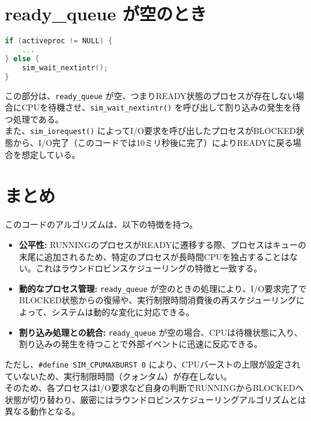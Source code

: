 \documentclass{article}
\begin{document}
\section*{ready\_queue が空のとき}
\begin{lstlisting}[language=C]
if (activeproc != NULL) {
    ... 
} else {
    sim_wait_nextintr();
}
\end{lstlisting}
この部分は、\texttt{ready\_queue} が空、つまりREADY状態のプロセスが存在しない場合にCPUを待機させ、\texttt{sim\_wait\_nextintr()} を呼び出して割り込みの発生を待つ処理である。\\
また、\texttt{sim\_iorequest()} によってI/O要求を呼び出したプロセスがBLOCKED状態から、I/O完了（このコードでは10ミリ秒後に完了）によりREADYに戻る場合を想定している。

\section*{まとめ}
このコードのアルゴリズムは、以下の特徴を持つ。
\begin{itemize}
    \item \textbf{公平性:} RUNNINGのプロセスがREADYに遷移する際、プロセスはキューの末尾に追加されるため、特定のプロセスが長時間CPUを独占することはない。これはラウンドロビンスケジューリングの特徴と一致する。
    \item \textbf{動的なプロセス管理:} \texttt{ready\_queue} が空のときの処理により、I/O要求完了でBLOCKED状態からの復帰や、実行制限時間消費後の再スケジューリングによって、システムは動的な変化に対応できる。
    \item \textbf{割り込み処理との統合:} \texttt{ready\_queue} が空の場合、CPUは待機状態に入り、割り込みの発生を待つことで外部イベントに迅速に反応できる。
\end{itemize}

ただし、\texttt{\#define SIM\_CPUMAXBURST 0} により、CPUバーストの上限が設定されていないため、実行制限時間（クォンタム）が存在しない。\\
そのため、各プロセスはI/O要求など自身の判断でRUNNINGからBLOCKEDへ状態が切り替わり、厳密にはラウンドロビンスケジューリングアルゴリズムとは異なる動作となる。








\end{document}
